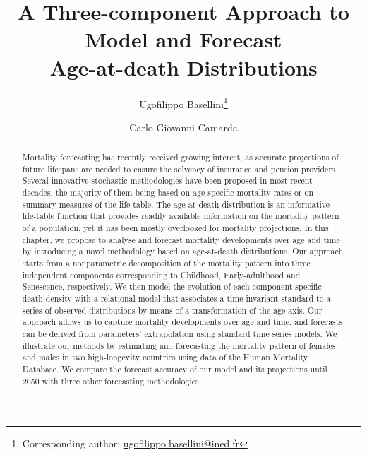 \documentclass[11pt, a4paper]{article}
\begin{document}

\title{A Three-component Approach to Model and Forecast\\ Age-at-death Distributions}	
\author[1,2]{Ugofilippo Basellini\thanks{Corresponding author: \url{ugofilippo.basellini@ined.fr}}}
\author[1]{Carlo Giovanni Camarda}

\maketitle
\thispagestyle{empty}

\begin{abstract}

Mortality forecasting has recently received growing interest, as accurate projections of future lifespans are needed to ensure the solvency of insurance and pension providers. Several innovative stochastic methodologies have been proposed in most recent decades, the majority of them being based on age-specific mortality rates or on summary measures of the life table. The age-at-death distribution is an informative life-table function that provides readily available information on the mortality pattern of a population, yet it has been mostly overlooked for mortality projections. In this chapter, we propose to analyse and forecast mortality developments over age and time by introducing a novel methodology based on age-at-death distributions. Our approach starts from a nonparametric decomposition of the mortality pattern into three independent components corresponding to Childhood, Early-adulthood and Senescence, respectively. We then model the evolution of each component-specific death density with a relational model that associates a time-invariant standard to a series of observed distributions by means of a transformation of the age axis. Our approach allows us to capture mortality developments over age and time, and forecasts can be derived from parameters' extrapolation using standard time series models. We illustrate our methods by estimating and forecasting the mortality pattern of females and males in two high-longevity countries using data of the Human Mortality Database. We compare the forecast accuracy of our model and its projections until 2050 with three other forecasting methodologies. 

\end{abstract}	
\end{document}
